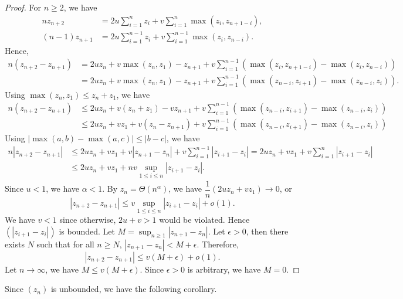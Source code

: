 \begin{proof}
  For $n \ge 2$, we have
  \begin{align*}
    nz_{n+2}     & = 2u\sum_{i=1}^n z_i + v\sum_{i=1}^n \max(z_i, z_{n+1-i}),       \\
    (n-1)z_{n+1} & = 2u\sum_{i=1}^{n-1} z_i + v\sum_{i=1}^{n-1} \max(z_i, z_{n-i}).
  \end{align*}
  Hence,
  \begin{equation}
    \label{eq:difference}
    \begin{aligned}
      n(z_{n+2} - z_{n+1})
       & = 2uz_n + v\max(z_n,z_1) - z_{n+1} + v\sum_{i=1}^{n-1} (\max(z_i, z_{n+1-i}) - \max(z_i, z_{n-i}))      \\
       & = 2uz_n + v\max(z_n,z_1) - z_{n+1} + v\sum_{i=1}^{n-1} (\max(z_{n-i}, z_{i+1}) - \max(z_{n-i}, z_{i})).
    \end{aligned}
  \end{equation}
  Using $\max(z_n, z_1) \le z_n+z_1$, we have
  \begin{align*}
    n(z_{n+2} - z_{n+1})
     & \le 2uz_n + v(z_n + z_1) - vz_{n+1} + v\sum_{i=1}^{n-1} (\max(z_{n-i}, z_{i+1}) - \max(z_{n-i}, z_{i})) \\
     & \le 2uz_n + vz_1 + v(z_n - z_{n+1}) + v\sum_{i=1}^{n-1} (\max(z_{n-i}, z_{i+1}) - \max(z_{n-i}, z_{i}))
  \end{align*}
  Using $|\max(a,b) - \max(a,c)| \le |b-c|$, we have
  \begin{align*}
    n|z_{n+2} - z_{n+1}|
     & \le 2uz_n + vz_1 + v|z_{n+1} - z_n| + v\sum_{i=1}^{n-1} |z_{i+1} - z_{i}| = 2uz_n + vz_1 + v\sum_{i=1}^{n}|z_{i+1} - z_i| \\
     & \le 2uz_n + vz_1 + nv\sup_{1\le i \le n}|z_{i+1} - z_i|.
  \end{align*}
  Since $u < 1$, we have $\alpha < 1$. By $z_n = \Theta(n^\alpha)$, we have $\dfrac{1}{n}(2uz_n + vz_1) \to 0$, or
  $$|z_{n+2} - z_{n+1}| \le v\sup_{1\le i \le n}|z_{i+1} - z_i| + o(1).$$
  We have $v < 1$ since otherwise, $2u+v > 1$ would be violated. Hence $(|z_{i+1} - z_i|)$ is bounded. Let $M = \sup_{n \ge 1} |z_{n+1} - z_n|$. Let $\epsilon > 0$, then there exists $N$ such that for all $n \ge N$, $|z_{n+1} - z_n| < M + \epsilon$. Therefore,
  $$|z_{n+2} - z_{n+1}| \le v(M+\epsilon) + o(1).$$
  Let $n\to\infty$, we have $M \le v(M+\epsilon)$. Since $\epsilon > 0$ is arbitrary, we have $M = 0$.
\end{proof}

Since $(z_n)$ is unbounded, we have the following corollary.

